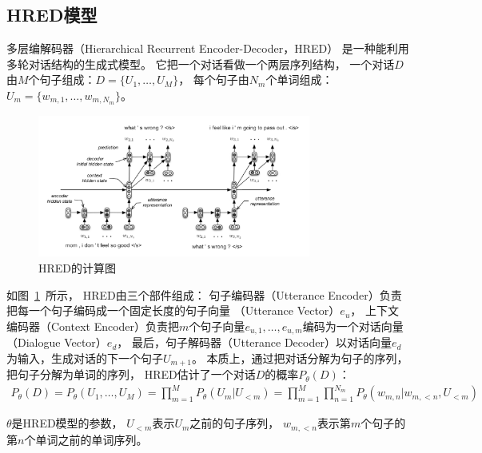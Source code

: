 \subsection{HRED模型}\label{subsec:HRED}
多层编解码器（Hierarchical Recurrent Encoder-Decoder，HRED）
是一种能利用多轮对话结构的生成式模型。
它把一个对话看做一个两层序列结构，
一个对话$D$由$M$个句子组成：$D = \{ U_1, \dots, U_M \}$，
每个句子由$N_m$个单词组成：$U_m = \{ w_{m, 1}, \dots, w_{m, N_m} \}$。
\begin{figure}[H]
    \centering
    \includegraphics[width=0.8\textwidth]{figure/HRED.png}
    \caption{HRED的计算图}
    \label{fig:HRED}
\end{figure}

如图~\ref{fig:HRED}~所示，
HRED由三个部件组成：
句子编码器（Utterance Encoder）负责把每一个句子编码成一个固定长度的句子向量
（Utterance Vector）$e_u$，
上下文编码器（Context Encoder）负责把$m$个句子向量$e_{u,1}, \dots, e_{u,m}$编码为一个对话向量
（Dialogue Vector）$e_d$，
最后，句子解码器（Utterance Decoder）以对话向量$e_d$为输入，生成对话的下一个句子$U_{m+1}$。
本质上，通过把对话分解为句子的序列，把句子分解为单词的序列，
HRED估计了一个对话$D$的概率$P_{\theta}(D)$：
\begin{align}
    P_{\theta}(D) =
    P_{\theta}(U_1, \dots, U_M) = \prod_{m=1}^M P_{\theta}(U_m|U_{<m})
    = \prod_{m=1}^M \prod_{n=1}^{N_m} P_{\theta}( w_{m, n} |w_{m, <n}, U_{<m} )
\end{align}

$\theta$是HRED模型的参数，
$U_{<m}$表示$U_m$之前的句子序列，
$w_{m, <n}$表示第$m$个句子的第$n$个单词之前的单词序列。

